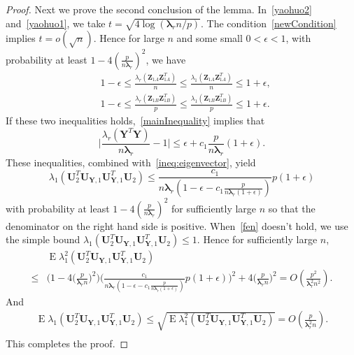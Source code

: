 \documentclass[12pt]{article} %
\DeclareMathOperator{\myE}{E}
\newcommand{\bZ}{\mathbf{Z}}
\newcommand{\bY}{\mathbf{Y}}
\newcommand{\bU}{\mathbf{U}}
\newcommand{\bfsym}[1]{\ensuremath{\boldsymbol{#1}}}
\def\blambda {\bfsym {\lambda}}
\theoremstyle{definition}
\begin{document}
\begin{appendices}
\begin{proof}
Next we prove the second conclusion of the lemma.
In~\eqref{yaohuo2} and~\eqref{yaohuo1}, we take $t=\sqrt{4\log(\blambda_r n/p)}$.
The condition~\eqref{newCondition} implies $t=o(\sqrt{n})$.
Hence for large $n$ and some small $0<\epsilon<1$, with probability at least $1-4(\frac{p}{ n\blambda_r})^2$, we have
$$
\begin{aligned}
    &1-\epsilon\leq \frac{\lambda_r(\bZ_{1A}\bZ_{1A}^T)}{n}\leq
\frac{\lambda_1(\bZ_{1A}\bZ_{1A}^T)}{n}\leq 1+\epsilon,\\
    &1-\epsilon\leq \frac{\lambda_r(\bZ_{1B}\bZ_{1B}^T)}{p}\leq
\frac{\lambda_1(\bZ_{1B}\bZ_{1B}^T)}{p}\leq 1+\epsilon.
\end{aligned}
$$
If these two inequalities holds,~\eqref{mainInequality} implies that
$$
\Big|\frac{\lambda_r(\bY^T \bY)}{n\blambda_r}-1\Big|
\leq 
\epsilon+c_1\frac{p}{n\blambda_r}(1+\epsilon).
$$
These inequalities, combined with~\eqref{ineq:eigenvector}, yield
\begin{equation}\label{fen}
\lambda_{1}(\bU_{2}^T \bU_{\bY,1} \bU_{\bY,1}^T \bU_{2})\leq
\frac{c_1}{n\blambda_r(1-\epsilon-c_1\frac{p}{n\blambda_r (1+\epsilon)})}p(1+\epsilon)
\end{equation}
with probability at least $1-4(\frac{p}{n\blambda_r})^2$ for sufficiently large $n$ so that the denominator on the right hand side is positive.
When~\eqref{fen} doesn't hold, we use the simple bound $\lambda_{1}(\bU_{2}^T \bU_{\bY,1} \bU_{\bY,1}^T \bU_{2})\leq 1$.
Hence for sufficiently large $n$,
$$
\begin{aligned}
    &\myE\lambda_{1}^2(\bU_{2}^T \bU_{\bY,1} \bU_{\bY,1}^T \bU_{2})\\
    \leq&
\Big(1-4\big(\frac{p}{\blambda_r n}\big)^2\Big)
\Big(\frac{c_1}{n\blambda_r(1-\epsilon-c_1\frac{p}{n\blambda_r (1+\epsilon)})}p(1+\epsilon)\Big)^2
+4\Big(\frac{p}{\blambda_r n}\Big)^2=O(\frac{p^2}{\blambda_r^2 n^2}).
\end{aligned}
$$
And
$$
\begin{aligned}
    \myE\lambda_{1}(\bU_{2}^T \bU_{\bY,1} \bU_{\bY,1}^T \bU_{2})
    \leq
    \sqrt{\myE\lambda_{1}^2(\bU_{2}^T \bU_{\bY,1} \bU_{\bY,1}^T \bU_{2})}=O(\frac{p}{\blambda_r^2 n}).\\
\end{aligned}
$$
This completes the proof.
\end{proof}


\end{appendices}
\end{document}
